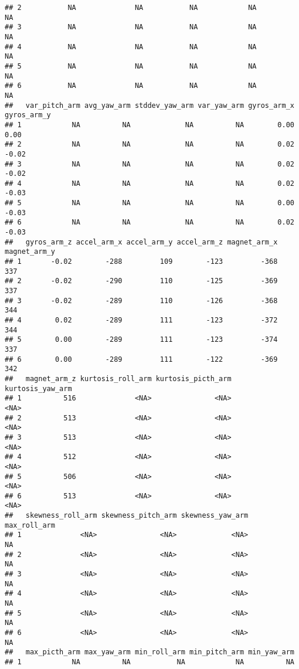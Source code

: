 \documentclass[
]{article}
\begin{document}
\begin{verbatim}
## 2           NA              NA           NA            NA               NA
## 3           NA              NA           NA            NA               NA
## 4           NA              NA           NA            NA               NA
## 5           NA              NA           NA            NA               NA
## 6           NA              NA           NA            NA               NA
##   var_pitch_arm avg_yaw_arm stddev_yaw_arm var_yaw_arm gyros_arm_x gyros_arm_y
## 1            NA          NA             NA          NA        0.00        0.00
## 2            NA          NA             NA          NA        0.02       -0.02
## 3            NA          NA             NA          NA        0.02       -0.02
## 4            NA          NA             NA          NA        0.02       -0.03
## 5            NA          NA             NA          NA        0.00       -0.03
## 6            NA          NA             NA          NA        0.02       -0.03
##   gyros_arm_z accel_arm_x accel_arm_y accel_arm_z magnet_arm_x magnet_arm_y
## 1       -0.02        -288         109        -123         -368          337
## 2       -0.02        -290         110        -125         -369          337
## 3       -0.02        -289         110        -126         -368          344
## 4        0.02        -289         111        -123         -372          344
## 5        0.00        -289         111        -123         -374          337
## 6        0.00        -289         111        -122         -369          342
##   magnet_arm_z kurtosis_roll_arm kurtosis_picth_arm kurtosis_yaw_arm
## 1          516              <NA>               <NA>             <NA>
## 2          513              <NA>               <NA>             <NA>
## 3          513              <NA>               <NA>             <NA>
## 4          512              <NA>               <NA>             <NA>
## 5          506              <NA>               <NA>             <NA>
## 6          513              <NA>               <NA>             <NA>
##   skewness_roll_arm skewness_pitch_arm skewness_yaw_arm max_roll_arm
## 1              <NA>               <NA>             <NA>           NA
## 2              <NA>               <NA>             <NA>           NA
## 3              <NA>               <NA>             <NA>           NA
## 4              <NA>               <NA>             <NA>           NA
## 5              <NA>               <NA>             <NA>           NA
## 6              <NA>               <NA>             <NA>           NA
##   max_picth_arm max_yaw_arm min_roll_arm min_pitch_arm min_yaw_arm
## 1            NA          NA           NA            NA          NA

\end{verbatim}
\end{document}
